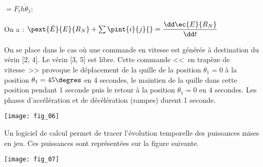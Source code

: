 \begin{multicols}{2}
\begin{corrige}
\begin{itemize}
$=F_t h \dot{\theta}_1$;

\end{itemize}
\end{corrige}
\else
\fi

\ifprof
\begin{corrige}
On a :
$\pext{\bar{E}}{E}{R_N} + \sum \pint{i}{j}{}=\dfrac{\dd \ec{E}{R_N}}{\dd t}$
\end{corrige}
\else
\fi

\else
\fi


\iftdifficile

\else
\fi

\ifprof
\else


On se place dans le cas où une commande en vitesse est générée à destination du vérin [2, 4]. Le vérin [3, 5]
est libre. Cette commande <<~en trapèze de vitesse~>>  provoque le déplacement de la quille de la position $\theta_1=0$
 à la position $\theta_1 = 45\degres$ en 4 secondes, le maintien de la quille dans cette position pendant 1 seconde puis le
 retour à la position $\theta_1=0$ en 4 secondes. Les phases d’accélération et de décélération (rampes) durent 1 seconde.


\begin{center}
\texttt{[image: fig\_06]}
\end{center}

Un logiciel de calcul permet de tracer l’évolution temporelle des puissances mises en jeu. Ces puissances sont
représentées sur la figure suivante. 

\begin{center}
\texttt{[image: fig\_07]}
\end{center}

\fi


\end{multicols}
